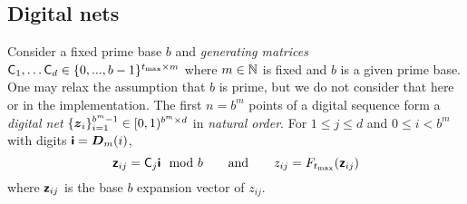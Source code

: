 \documentclass[acmsmall]{acmart}
\begin{document}
\subsection{Digital nets} 

Consider a fixed prime base $b$ and \emph{generating matrices} ${\mathsf{C}}_1,\dots{\mathsf{C}}_d \in \{0,...,b-1\}^{t_\mathrm{max} \times m}$ where $m \in {\mathbb{N}}$ is fixed and $b$ is a given prime base. One may relax the assumption that $b$ is prime, but we do not consider that here or in the implementation. The first $n=b^m$ points of a digital sequence form a \emph{digital net} $\{{\boldsymbol{z}}_i\}_{i=1}^{b^m-1} \in [0,1)^{b^m \times d}$ in \emph{natural order}. For $1 \leq j \leq d$ and $0 \leq i < b^m$ with digits ${\boldsymbol{\mathsf{i}}} = {\boldsymbol{D}}_m(i)$,
$${\boldsymbol{\mathsf{z}}}_{ij} = {\mathsf{C}}_j {\boldsymbol{\mathsf{i}}} \mod b \qquad\text{and}\qquad z_{ij} = F_{t_\mathrm{max}}({\boldsymbol{\mathsf{z}}}_{ij})$$
where ${\boldsymbol{\mathsf{z}}}_{ij}$ is the base $b$ expansion vector of $z_{ij}$. 
\end{document}

